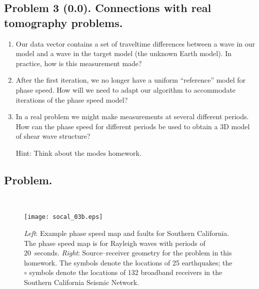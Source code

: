 \documentclass[11pt,titlepage,fleqn]{article}
\begin{document}

\pagebreak
\subsection*{Problem 3 (0.0). Connections with real tomography problems.}

\begin{enumerate}
\item Our data vector contains a set of traveltime differences between a wave in our model and a wave in the target model (\ie the unknown Earth model). In practice, how is this measurement made?

\item After the first iteration, we no longer have a uniform ``reference'' model for phase speed. How will we need to adapt our algorithm to accommodate iterations of the phase speed model?


\item In a real problem we might make measurements at several different periods. How can the phase speed for different periods be used to obtain a 3D model of shear wave structure?

Hint: Think about the modes homework.

\end{enumerate}


\subsection*{Problem.} \howmuchtime\




\clearpage\pagebreak

\begin{figure}
\hspace{-0.5cm}
\texttt{[image: socal\_03b.eps]}
\caption[Source--receiver geometry for southern California]
{{
{\em Left}: Example phase speed map and faults for Southern California. The phase speed map is for Rayleigh waves with periods of 20~seconds.
{\em Right}: Source--receiver geometry for the problem in this homework. The  symbols denote the locations of 25 earthquakes; the $\circ$ symbols denote the locations of 132 broadband receivers in the Southern California Seismic Network.
\label{fig:geometry}
}}
\end{figure}
\end{document}
